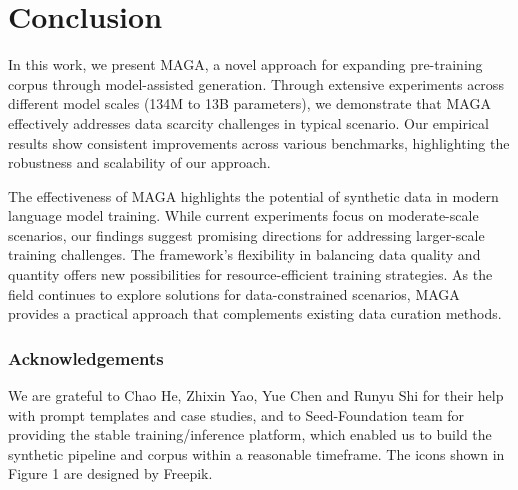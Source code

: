 \section{Conclusion}

In this work, we present MAGA, a novel approach for expanding pre-training corpus through model-assisted generation. 
Through extensive experiments across different model scales (134M to 13B parameters),
we demonstrate that MAGA effectively addresses data scarcity challenges in typical scenario.
Our empirical results show consistent improvements across various benchmarks, highlighting the robustness and scalability of our approach.

The effectiveness of MAGA highlights the potential of synthetic data in modern language model training. 
While current experiments focus on moderate-scale scenarios, our findings suggest promising directions for addressing larger-scale training challenges. 
The framework's flexibility in balancing data quality and quantity offers new possibilities for resource-efficient training strategies. 
As the field continues to explore solutions for data-constrained scenarios, MAGA provides a practical approach that complements existing data curation methods.

\subsubsection*{Acknowledgements}
We are grateful to Chao He, Zhixin Yao, Yue Chen and Runyu Shi for their help with prompt templates and case studies,
and to Seed-Foundation team for providing the stable training/inference platform, 
which enabled us to build the synthetic pipeline and corpus within a reasonable timeframe.
The icons shown in Figure 1 are designed by Freepik.
